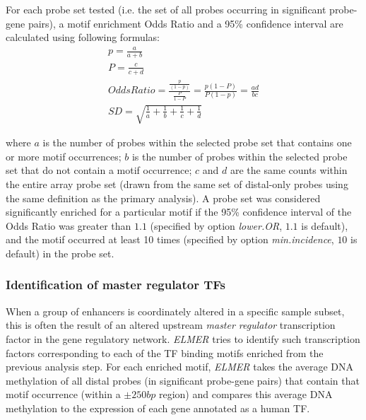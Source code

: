 For each probe set tested (i.e. the set of all probes occurring in significant probe-gene pairs), a motif enrichment Odds Ratio and a 95\% confidence interval are calculated using following formulas:
\begin{subequations}
\begin{align}
p = \frac{a}{a + b} \\
P = \frac{c}{c + d} \\
Odds Ratio = \frac{\frac{p}{(1-p)}}{\frac{P}{1-P}}= \frac{p(1-P)}{P(1-p)}=\frac{ad}{bc} \\
SD = \sqrt{\frac{1}{a} + \frac{1}{b} + \frac{1}{c} + \frac{1}{d}}
\end{align}
\end{subequations}

where $a$ is the number of probes within the selected probe set that contains one 
or more motif occurrences; $b$ is the number of probes within the selected probe 
set that do not contain a motif occurrence; $c$ and $d$ are the same counts within 
the entire array probe set (drawn from the same set of distal-only probes using the same definition as the primary analysis). A probe set was considered significantly enriched 
for a particular motif if the 95\% confidence interval of the Odds Ratio was 
greater than $1.1$ (specified by option \textit{lower.OR}, $1.1$ is default), and the motif 
occurred at least 10 times (specified by option \textit{min.incidence}, $10$ is default) in 
the probe set. 


\subsubsection{Identification of master regulator TFs}

When a group of enhancers is coordinately altered in a specific sample subset, this is often the result of an altered upstream \textit{master regulator} transcription factor in the gene regulatory network. \textit{ELMER} tries to identify such transcription factors corresponding to each of the TF binding motifs enriched from the previous analysis step.
For each enriched motif, \textit{ELMER} takes the average DNA methylation of all distal probes (in significant probe-gene pairs) that contain that motif occurrence (within a $\pm 250bp$ region) and compares this average DNA methylation to the expression of each gene annotated as a human TF.

